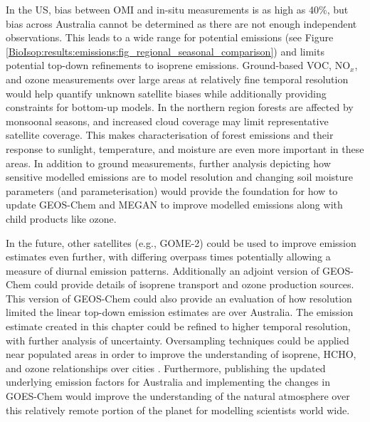   In the US, bias between OMI and in-situ measurements is as high as 40\%, but 
  bias across Australia cannot be determined as there are not enough independent observations.
  This leads to a wide range for potential emissions (see Figure \ref{BioIsop:results:emissions:fig_regional_seasonal_comparison}) and limits potential top-down refinements to isoprene emissions.
  Ground-based VOC, NO$_x$, and ozone measurements over large areas at relatively fine temporal resolution would help quantify unknown satellite biases while additionally providing constraints for bottom-up models.
  In the northern region forests are affected by monsoonal seasons, and increased cloud coverage may limit representative satellite coverage. This makes characterisation of forest emissions and their response to sunlight, temperature, and moisture are even more important in these areas.
  In addition to ground measurements, further analysis depicting how sensitive modelled emissions are to model resolution and changing soil moisture parameters (and parameterisation) would provide the foundation for how to update GEOS-Chem and MEGAN to improve modelled emissions along with child products like ozone.

  
  In the future, other satellites (e.g., GOME-2) could be used to improve emission estimates even further, with differing overpass times potentially allowing a measure of diurnal emission patterns.
  Additionally an adjoint version of GEOS-Chem could provide details of isoprene transport and ozone production sources.
  This version of GEOS-Chem could also provide an evaluation of how resolution limited the linear top-down emission estimates are over Australia.
  The emission estimate created in this chapter could be refined to higher temporal resolution, with further analysis of uncertainty.
  Oversampling techniques could be applied near populated areas in order to improve the understanding of isoprene, HCHO, and ozone relationships over cities \parencite[e.g.,][]{Surl2018}.
  Furthermore, publishing the updated underlying emission factors for Australia and implementing the changes in GOES-Chem would improve the understanding of the natural atmosphere over this relatively remote portion of the planet for modelling scientists world wide.

%  
  